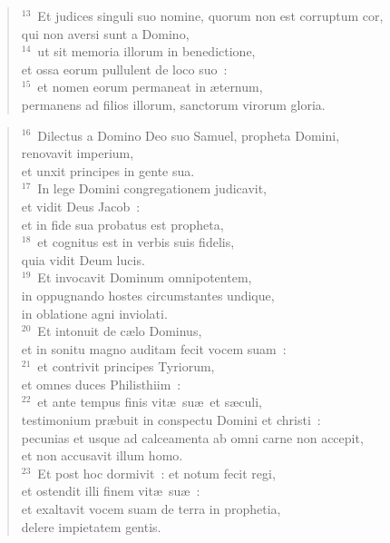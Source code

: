 \begin{verse}${}^{13}$~Et judices singuli suo nomine, quorum non est corruptum cor,\\ qui non aversi sunt a Domino,\\
${}^{14}$~ut sit memoria illorum in benedictione,\\ et ossa eorum pullulent de loco suo~:\\
${}^{15}$~et nomen eorum permaneat in \ae ternum,\\ permanens ad filios illorum, sanctorum virorum gloria.\end{verse}


\begin{verse}${}^{16}$~Dilectus a Domino Deo suo Samuel, propheta Domini,\\ renovavit imperium,\\ et unxit principes in gente sua.\\
${}^{17}$~In lege Domini congregationem judicavit,\\ et vidit Deus Jacob~:\\ et in fide sua probatus est propheta,\\
${}^{18}$~et cognitus est in verbis suis fidelis,\\ quia vidit Deum lucis.\\
${}^{19}$~Et invocavit Dominum omnipotentem,\\ in oppugnando hostes circumstantes undique,\\ in oblatione agni inviolati.\\
${}^{20}$~Et intonuit de c\ae lo Dominus,\\ et in sonitu magno auditam fecit vocem suam~:\\
${}^{21}$~et contrivit principes Tyriorum,\\ et omnes duces Philisthiim~:\\
${}^{22}$~et ante tempus finis vit\ae\ su\ae\ et s\ae culi,\\ testimonium pr\ae buit in conspectu Domini et christi~:\\ pecunias et usque ad calceamenta ab omni carne non accepit,\\ et non accusavit illum homo.\\
${}^{23}$~Et post hoc dormivit~: et notum fecit regi,\\ et ostendit illi finem vit\ae\ su\ae~:\\ et exaltavit vocem suam de terra in prophetia,\\ delere impietatem gentis.\end{verse}


